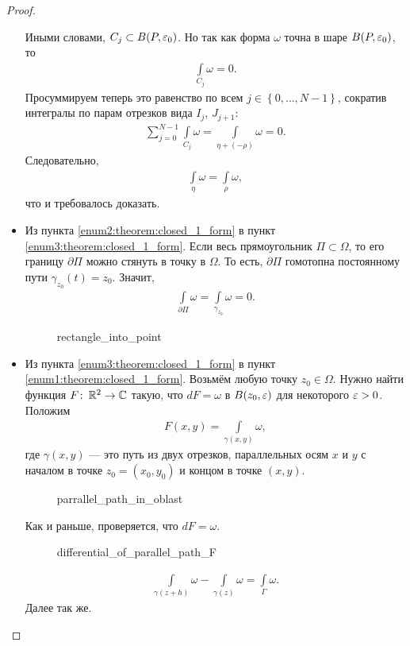 \begin{proof}
\begin{itemize}
   Иными словами, $C_j \subset B(P,\varepsilon_0)$. Но так как форма $\omega$ точна в шаре $B(P,\varepsilon_0)$, то
   \begin{align*}
    \int\limits_{C_j} \omega = 0.
   \end{align*} Просуммируем теперь это равенство по всем $j \in \left\{ 0, \ldots,N-1 \right\}$, сократив интегралы по парам отрезков вида $I_j$, $J_{j+1}$:
   \begin{align*}
    \sum_{j=0}^{N-1} \int\limits_{C_j} \omega = \int\limits_{\eta + (- \rho)}  \omega = 0.
   \end{align*} Следовательно,
   \begin{align*}
    \int\limits_{\eta} \omega = \int\limits_{\rho} \omega,  
   \end{align*} что и требовалось доказать.
  \item Из пункта \ref{enum2:theorem:closed_1_form} в пункт \ref{enum3:theorem:closed_1_form}. Если весь прямоугольник $\Pi \subset \Omega$, то его границу $\partial \Pi$ можно стянуть в точку в $\Omega$. То есть, $\partial\Pi$ гомотопна постоянному пути $\gamma_{z_0}(t) = z_0$. Значит,
   \begin{align*}
    \int\limits_{\partial\Pi} \omega = \int\limits_{\gamma_{z_0}}   \omega = 0.
   \end{align*} 
\begin{figure}[ht]
    \centering
    \caption{rectangle_into_point}
    \label{fig:rectangle_into_point}
\end{figure}

\item Из пункта \ref{enum3:theorem:closed_1_form} в пункт \ref{enum1:theorem:closed_1_form}. Возьмём любую точку $z_0 \in \Omega$. Нужно найти функция $F \colon\, \mathbb{R}^{2} \to \mathbb{C}$ такую, что $dF = \omega$ в $B(z_0,\varepsilon)$ для некоторого $\varepsilon > 0$. Положим
 \begin{align*}
  F(x,y) = \int\limits_{\gamma(x,y)} \omega,
 \end{align*} где $\gamma(x,y)$ --- это путь из двух отрезков, параллельных осям $x$ и $y$ с началом в точке $z_0 = (x_0, y_0)$ и концом в точке $(x,y)$.

\begin{figure}[ht]
    \centering
    \caption{parrallel_path_in_oblast}
    \label{fig:parrallel_path_in_oblast}
\end{figure}

 Как и раньше, проверяется, что $dF = \omega$.

\begin{figure}[ht]
    \centering
    \caption{differential_of_parallel_path_F}
    \label{fig:differential_of_parallel_path_f}
\end{figure}

  \begin{align*}
   \int\limits_{\gamma(z+h)}  \omega - \int\limits_{\gamma(z)}  \omega = \int\limits_{\Gamma} \omega. 
  \end{align*} Далее так же.
 \end{itemize}
\end{proof}

